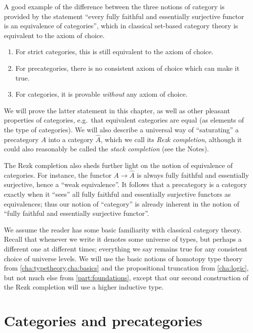 A good example of the difference between the three notions of category is provided by the statement ``every fully faithful and essentially surjective functor is an equivalence of categories'', which in classical set-based category theory is equivalent to the axiom of choice.
%
%
%
\begin{enumerate}
\item For strict categories, this is still equivalent to the axiom of choice.
\item For precategories, there is no consistent axiom of choice which can make it true.
\item For categories, it is provable \emph{without} any axiom of choice.
\end{enumerate}
We will prove the latter statement in this chapter, as well as other pleasant properties of categories, e.g.\ that equivalent categories are equal (as elements of the type of categories).
We will also describe a universal way of ``saturating'' a precategory $A$ into a category $\widehat A$, which we call its \emph{Rezk completion},
%
although it could also reasonably be called the \emph{stack completion} (see the Notes).

The Rezk completion also sheds further light on the notion of equivalence of categories.
For instance, the functor $A \to \widehat{A}$ is always fully faithful and essentially surjective, hence a ``weak equivalence''.
It follows that a precategory is a category exactly when it ``sees'' all fully faithful and essentially surjective functors as equivalences; thus our notion of ``category'' is already inherent in the notion of ``fully faithful and essentially surjective functor''.

We assume the reader has some basic familiarity with classical category theory.
Recall that whenever we write \type it denotes some universe of types, but perhaps a different one at different times; everything we say remains true for any consistent choice of universe levels.
We will use the basic notions of homotopy type theory from \cref{cha:typetheory,cha:basics} and the propositional truncation from \cref{cha:logic}, but not much else from \cref{part:foundations}, except that our second construction of the Rezk completion will use a higher inductive type.


\section{Categories and precategories}
\label{sec:cats}

